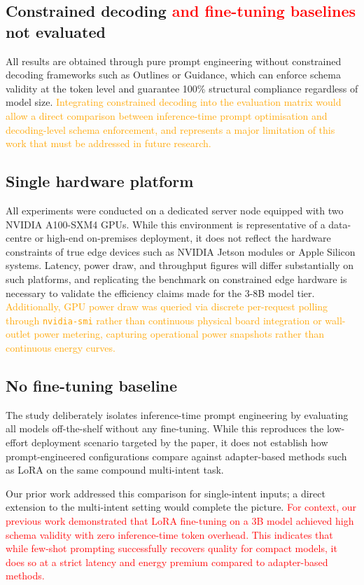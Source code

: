 \documentclass[journal,article,submit,pdftex,moreauthors]{Definitions/mdpi}
\begin{document}
\subsection{Constrained decoding \textcolor{red}{and fine-tuning baselines} not evaluated}
All results are obtained through pure prompt engineering without constrained decoding frameworks such as Outlines or Guidance, which can enforce schema validity at the token level and guarantee 100\% structural compliance regardless of model size. \textcolor{orange}{Integrating constrained decoding into the evaluation matrix would allow a direct comparison between inference-time prompt optimisation and decoding-level schema enforcement, and represents a major limitation of this work that must be addressed in future research.}

\subsection{Single hardware platform}
All experiments were conducted on a dedicated server node equipped with two NVIDIA A100-SXM4 GPUs. While this environment is representative of a data-centre or high-end on-premises deployment, it does not reflect the hardware constraints of true edge devices such as NVIDIA Jetson modules or Apple Silicon systems. Latency, power draw, and throughput figures will differ substantially on such platforms, and replicating the benchmark on constrained edge hardware is necessary to validate the efficiency claims made for the 3-8B model tier. \textcolor{orange}{Additionally, GPU power draw was queried via discrete per-request polling through \texttt{nvidia-smi} rather than continuous physical board integration or wall-outlet power metering, capturing operational power snapshots rather than continuous energy curves.}

\subsection{No fine-tuning baseline}
The study deliberately isolates inference-time prompt engineering by evaluating all models off-the-shelf without any fine-tuning. While this reproduces the low-effort deployment scenario targeted by the paper, it does not establish how prompt-engineered configurations compare against adapter-based methods such as LoRA on the same compound multi-intent task.

Our prior work addressed this comparison for single-intent inputs; a direct extension to the multi-intent setting would complete the picture. \textcolor{red}{For context, our previous work \cite{karlovic2026} demonstrated that LoRA fine-tuning on a 3B model achieved high schema validity with zero inference-time token overhead. This indicates that while few-shot prompting successfully recovers quality for compact models, it does so at a strict latency and energy premium compared to adapter-based methods.}
\end{document}
